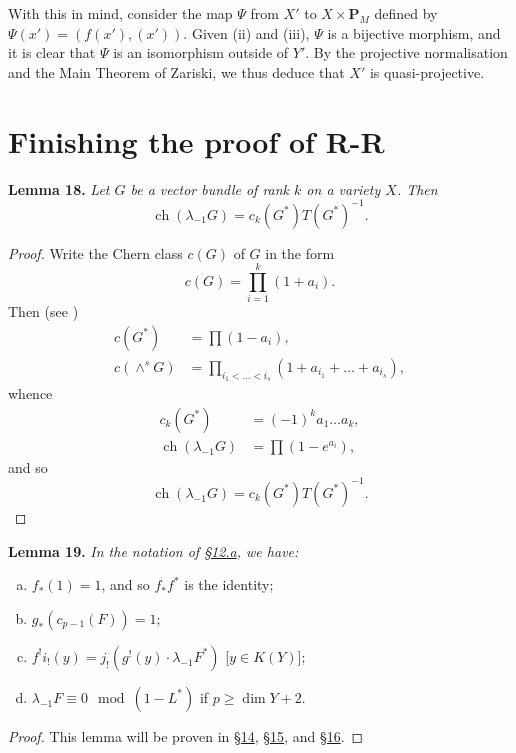 \documentclass{article}
\newenvironment{itenv}[1]
  {\phantomsection\par\medskip\noindent\textbf{#1.}\itshape}
  {\par\medskip}
\newcommand{\PP}{\mathbf{P}}
\renewcommand{\geq}{\geqslant}
\DeclareMathOperator{\ch}{ch}
\begin{document}
With this in mind, consider the map $\Psi$ from $X'$ to $X\times\PP_M$ defined by $\Psi(x')=(f(x'),(x'))$.
Given (ii) and (iii), $\Psi$ is a bijective morphism, and it is clear that $\Psi$ is an isomorphism outside of $Y'$.
By the projective normalisation and the Main Theorem of Zariski, we thus deduce that $X'$ is quasi-projective.


\section{Finishing the proof of R-R}
\label{section13}

\begin{itenv}{Lemma 18}
\label{lemma18}
  Let $G$ be a vector bundle of rank $k$ on a variety $X$.
  Then
  \[
    \ch(\lambda_{-1}G) = c_k(G^*)T(G^*)^{-1}.
  \]
\end{itenv}

\begin{proof}
  Write the Chern class $c(G)$ of $G$ in the form
  \[
    c(G) = \prod_{i=1}^k (1+a_i).
  \]
  Then (see \cite{9})
  \begin{align*}
    c(G^*) &= \prod (1-a_i),
  \\c(\wedge^sG) &= \prod_{i_1<\ldots<i_s} (1+a_{i_1}+\ldots+a_{i_s}),
  \end{align*}
  whence
  \begin{align*}
    c_k(G^*) &= (-1)^k a_1\ldots a_k,
  \\\ch(\lambda_{-1}G) &= \prod (1-e^{a_i}),
  \end{align*}
  and so
  \[
    \ch(\lambda_{-1}G) = c_k(G^*)T(G^*)^{-1}.
  \]
\end{proof}

\begin{itenv}{Lemma 19}
\label{lemma19}
  In the notation of \hyperref[section12a]{\S12.a}, we have:
  \begin{enumerate}[(a)]
    \item $f_*(1) = 1$, and so $f_*f^*$ is the identity;
    \item $g_*(c_{p-1}(F)) = 1$;
    \item $f^!i_!(y) = j_!(g^!(y)\cdot\lambda_{-1}F^*)$ [$y\in K(Y)$];
    \item $\lambda_{-1}F\equiv0 \mod(1-L^*)$ if $p\geq\dim Y+2$.
  \end{enumerate}
\end{itenv}

\begin{proof}
  This lemma will be proven in \hyperref[section14]{\S14}, \hyperref[section15]{\S15}, and \hyperref[section16]{\S16}.
\end{proof}
\end{document}
